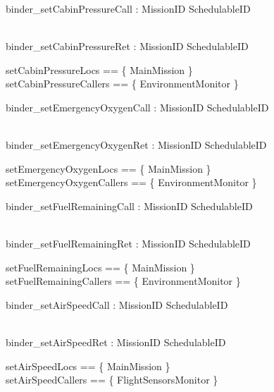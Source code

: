 

\begin{circus}

\circchannel binder\_setCabinPressureCall :  MissionID  \cross SchedulableID   \cross
{}

\\
\circchannel binder\_setCabinPressureRet : MissionID  \cross SchedulableID  \\
\end{circus}
%
\begin{zed}
setCabinPressureLocs == \{ MainMission \}  \\
setCabinPressureCallers == \{ EnvironmentMonitor \}
\end{zed}
%
\begin{circus}

\circchannel binder\_setEmergencyOxygenCall :  MissionID  \cross SchedulableID   \cross
{}

\\
\circchannel binder\_setEmergencyOxygenRet : MissionID  \cross SchedulableID  \\
\end{circus}
%
\begin{zed}
setEmergencyOxygenLocs == \{ MainMission \}  \\
setEmergencyOxygenCallers == \{ EnvironmentMonitor \}
\end{zed}
%
\begin{circus}

\circchannel binder\_setFuelRemainingCall :  MissionID  \cross SchedulableID   \cross
{}

\\
\circchannel binder\_setFuelRemainingRet : MissionID  \cross SchedulableID  \\
\end{circus}
%
\begin{zed}
setFuelRemainingLocs == \{ MainMission \}  \\
setFuelRemainingCallers == \{ EnvironmentMonitor \}
\end{zed}
%
\begin{circus}

\circchannel binder\_setAirSpeedCall :  MissionID  \cross SchedulableID   \cross
{}

\\
\circchannel binder\_setAirSpeedRet : MissionID  \cross SchedulableID  \\
\end{circus}
%
\begin{zed}
setAirSpeedLocs == \{ MainMission \}  \\
setAirSpeedCallers == \{ FlightSensorsMonitor \}
\end{zed}
